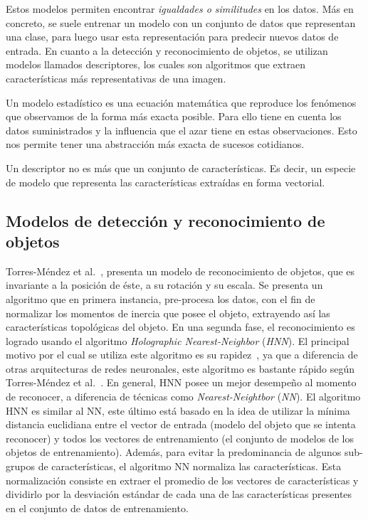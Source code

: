 Estos modelos permiten encontrar \textit{igualdades o similitudes} en los datos. Más en concreto, se suele entrenar un modelo con un conjunto de datos que representan una clase, para luego usar esta representación para predecir nuevos datos de entrada. En cuanto a la detección y reconocimiento de objetos, se utilizan modelos llamados descriptores, los cuales son algoritmos que extraen características más representativas de una imagen.

\begin{definition}\label{def:mod_est}
Un modelo estadístico es una ecuación matemática que reproduce los fenómenos que observamos de la forma más exacta posible. Para ello tiene en cuenta los datos suministrados y la influencia que el azar tiene en estas observaciones. Esto nos permite tener una abstracción más exacta de sucesos cotidianos.
\end{definition}
\begin{definition}[Descriptor]\label{def:desc}
Un descriptor no es más que un conjunto de características. Es decir, un especie de modelo que representa las características extraídas en forma vectorial.
\end{definition}


\subsection{Modelos de detección y reconocimiento de objetos}
Torres-Méndez et al.~\cite{trsi2000}, presenta un modelo de reconocimiento de objetos, que es invariante a la posición de éste, a su rotación y su escala. Se presenta un algoritmo que en primera instancia, pre-procesa los datos, con el fin de normalizar los momentos de inercia que posee el objeto, extrayendo así las características topológicas del objeto. En una segunda fase, el reconocimiento es logrado usando el algoritmo \textit{Holographic Nearest-Neighbor} (\textit{HNN}). El principal motivo por el cual se utiliza este algoritmo es su rapidez~\cite{trsi2000}, ya que a diferencia de otras arquitecturas de redes neuronales, este algoritmo es bastante rápido según Torres-Méndez et al.~\cite{trsi2000}. En general, HNN posee un mejor desempeño al momento de reconocer, a diferencia de técnicas como \textit{Nearest-Neightbor} (\textit{NN}). El algoritmo HNN es similar al NN, este último está basado en la idea de utilizar la mínima distancia euclidiana entre el vector de entrada (modelo del objeto que se intenta reconocer) y todos los vectores de entrenamiento (el conjunto de modelos de los objetos de entrenamiento). Además, para evitar la predominancia de algunos sub-grupos de características, el algoritmo NN normaliza las características. Esta normalización consiste en extraer el promedio de los vectores de características y dividirlo por la desviación estándar de cada una de las características presentes en el conjunto de datos de entrenamiento.

